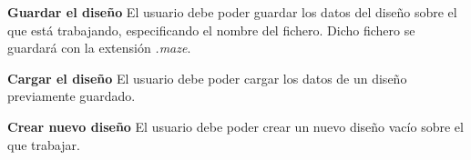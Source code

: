 	\item \textbf{Guardar el diseño}\newline
		El usuario debe poder guardar los datos del diseño sobre el que está trabajando, especificando el nombre del fichero. Dicho fichero se guardará con la extensión \textit{.maze}.
	\item \textbf{Cargar el diseño}\newline
		El usuario debe poder cargar los datos de un diseño previamente guardado.
	\item \textbf{Crear nuevo diseño}\newline
		El usuario debe poder crear un nuevo diseño vacío sobre el que trabajar.
